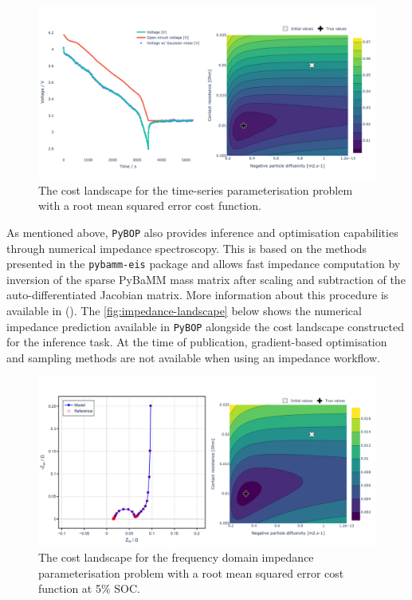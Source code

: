 \documentclass[
]{article}
\begin{document}
\begin{figure}
\centering
\includegraphics[width=1\textwidth,height=\textheight]{figures/joss/sim-landscape.png}
\caption{The cost landscape for the time-series parameterisation problem
with a root mean squared error cost function.
\label{fig:inference-time-landscape}}
\end{figure}

As mentioned above, \texttt{PyBOP} also provides inference and
optimisation capabilities through numerical impedance spectroscopy. This
is based on the methods presented in the \texttt{pybamm-eis} package and
allows fast impedance computation by inversion of the sparse PyBaMM mass
matrix after scaling and subtraction of the auto-differentiated Jacobian
matrix. More information about this procedure is available in
(). The
\autoref{fig:impedance-landscape} below shows the numerical impedance
prediction available in \texttt{PyBOP} alongside the cost landscape
constructed for the inference task. At the time of publication,
gradient-based optimisation and sampling methods are not available when
using an impedance workflow.

\begin{figure}
\centering
\includegraphics[width=1\textwidth,height=\textheight]{figures/joss/impedance.png}
\caption{The cost landscape for the frequency domain impedance
parameterisation problem with a root mean squared error cost function at
5\% SOC. \label{fig:impedance-landscape}}
\end{figure}
\end{document}
